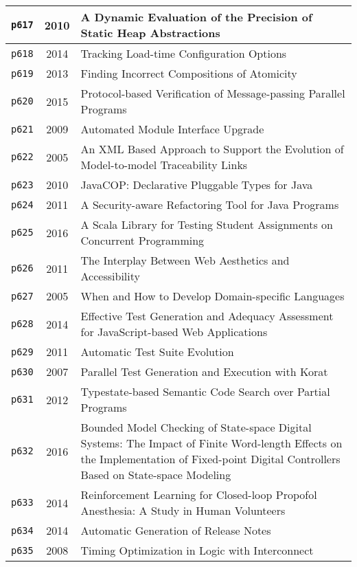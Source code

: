 \begin{longtable}{| c | c | p{16cm} |}
  \hline
  \texttt{p617} & 2010 & A Dynamic Evaluation of the Precision of Static Heap Abstractions \\
  \hline
  \texttt{p618} & 2014 & Tracking Load-time Configuration Options \\
  \hline
  \texttt{p619} & 2013 & Finding Incorrect Compositions of Atomicity \\
  \hline
  \texttt{p620} & 2015 & Protocol-based Verification of Message-passing Parallel Programs \\
  \hline
  \texttt{p621} & 2009 & Automated Module Interface Upgrade \\
  \hline
  \texttt{p622} & 2005 & An XML Based Approach to Support the Evolution of Model-to-model Traceability Links \\
  \hline
  \texttt{p623} & 2010 & JavaCOP: Declarative Pluggable Types for Java \\
  \hline
  \texttt{p624} & 2011 & A Security-aware Refactoring Tool for Java Programs \\
  \hline
  \texttt{p625} & 2016 & A Scala Library for Testing Student Assignments on Concurrent Programming \\
  \hline
  \texttt{p626} & 2011 & The Interplay Between Web Aesthetics and Accessibility \\
  \hline
  \texttt{p627} & 2005 & When and How to Develop Domain-specific Languages \\
  \hline
  \texttt{p628} & 2014 & Effective Test Generation and Adequacy Assessment for JavaScript-based Web Applications \\
  \hline
  \texttt{p629} & 2011 & Automatic Test Suite Evolution \\
  \hline
  \texttt{p630} & 2007 & Parallel Test Generation and Execution with Korat \\
  \hline
  \texttt{p631} & 2012 & Typestate-based Semantic Code Search over Partial Programs \\
  \hline
  \texttt{p632} & 2016 & Bounded Model Checking of State-space Digital Systems: The Impact of Finite Word-length Effects on the Implementation of Fixed-point Digital Controllers Based on State-space Modeling \\
  \hline
  \texttt{p633} & 2014 & Reinforcement Learning for Closed-loop Propofol Anesthesia: A Study in Human Volunteers \\
  \hline
  \texttt{p634} & 2014 & Automatic Generation of Release Notes \\
  \hline
  \texttt{p635} & 2008 & Timing Optimization in Logic with Interconnect \\

\end{longtable}
